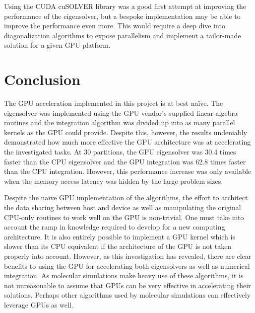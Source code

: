 \documentclass[conference, twoside]{IEEEtran}
\begin{document}
Using the CUDA cuSOLVER library was a good first attempt at improving the performance of the eigensolver, but a bespoke implementation may be able to improve the performance even more. This would require a deep dive into diagonalization algorithms to expose parallelism and implement a tailor-made solution for a given GPU platform.

\section{Conclusion} %

The GPU acceleration implemented in this project is at best na\"{i}ve. The eigensolver was implemented using the GPU vendor's supplied linear algebra routines and the integration algorithm was divided up into as many parallel kernels as the GPU could provide. Despite this, however, the results undeniably demonstrated how much more effective the GPU architecture was at accelerating the investigated tasks. At 30 partitions, the GPU eigensolver was 30.4 times faster than the CPU eigensolver and the GPU integration was 62.8 times faster than the CPU integration. However, this performance increase was only available when the memory access latency was hidden by the large problem sizes.

Despite the na\"{i}ve GPU implementation of the algorithms, the effort to architect the data sharing between host and device as well as manipulating the original CPU-only routines to work well on the GPU is non-trivial. One must take into account the ramp in knowledge required to develop for a new computing architecture. It is also entirely possible to implement a GPU kernel which is slower than its CPU equivalent if the architecture of the GPU is not taken properly into account. However, as this investigation has revealed, there are clear benefits to using the GPU for accelerating both eigensolvers as well as numerical integration. As molecular simulations make heavy use of these algorithms, it is not unreasonable to assume that GPUs can be very effective in accelerating their solutions. Perhaps other algorithms used by molecular simulations can effectively leverage GPUs as well.



\end{document}

